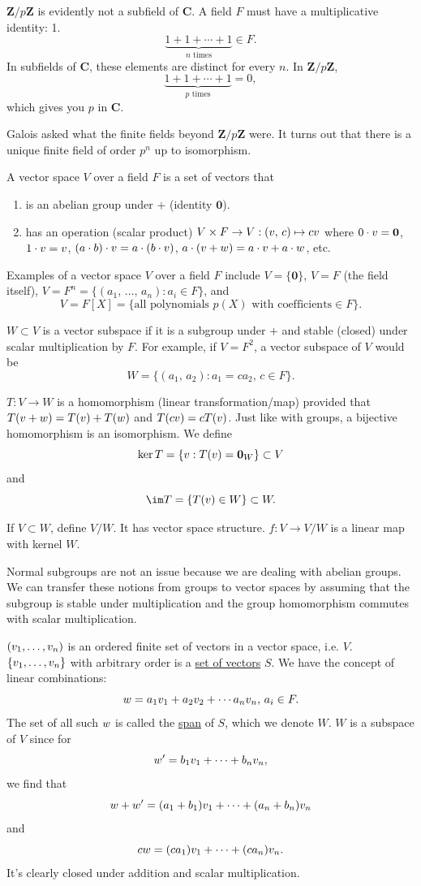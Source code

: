 \documentclass[11pt, oneside]{amsart}
\numberwithin{equation}{section}
\numberwithin{theorem}{section}
\theoremstyle{definition}
\let\bf\relax
\def\Z{\mathbf{Z}}
\def\C{\mathbf{C}}
\def\0{\mathbf{0}}
\begin{document}
$\Z/p\Z$ is evidently not a subfield of $\C$. A field $F$ must have a multiplicative identity: 1. $$\underbrace{1+1+\cdots+1}_{n \textrm{ times}}\in F.$$ In subfields of $\C$, these elements are distinct for every $n$. In $\Z/p\Z$, $$\underbrace{1+1+\cdots+1}_{p \textrm{ times}}=0,$$ which gives you $p$ in $\C$. 

Galois asked what the finite fields beyond $\Z/p\Z$ were. It turns out that there is a unique finite field of order $p^n$ up to isomorphism.

A vector space $V$ over a field $F$ is a set of vectors that
\begin{enumerate}[label=(\roman*)]
\item  is an abelian group under $+$ (identity $\0$).
\item has an operation (scalar product) $V\times F\to V : (\bf{v},\, c)\mapsto c\bf{v}$ where $0\cdot \bf{v} = \0$, $1\cdot \bf{v}=\bf{v}$, $(a\cdot b)\cdot \bf{v} = a\cdot(b\cdot\bf{v})$, $a\cdot(\bf{v}+\bf{w})=a\cdot\bf{v}+a\cdot\bf{w}$, etc.
\end{enumerate}

Examples of a vector space $V$ over a field $F$ include $V=\{\0\}$, $V=F$ (the field itself), $V=F^n=\{(a_1,\,\hdots,\,a_n) :a_i \in F\}$, and $$V=F[X]=\{\textrm{all polynomials $p(X)$ with coefficients} \in F\}.$$

$W\subset V$ is a vector subspace if it is a subgroup under $+$ and stable (closed) under scalar multiplication by $F$. For example, if $V=F^2$, a vector subspace of $V$ would be
$$
W=\{(a_1,\,a_2):a_1=ca_2,\,c\in F\}.
$$

$T:V\to W$ is a homomorphism (linear transformation/map) provided that $T(\bf{v}+\bf{w}) = T(\bf{v})+T( \bf{w})$ and $T(c\bf{v}) = cT(\bf{v})$. Just like with groups, a bijective homomorphism is an isomorphism. We define 
$$
\ker T = \{\bf{v}:T(\bf{v})=\0_W\} \subset V
$$
and
$$
\im T = \{T(\bf{v})\in W\}\subset W.
$$

If $V\subset W$, define $V/W$. It has vector space structure. $f:V\to V/W$ is a linear map with kernel $W$.

Normal subgroups are not an issue because we are dealing with abelian groups. We can transfer these notions from groups to vector spaces by assuming that the subgroup is stable under multiplication and the group homomorphism commutes with scalar multiplication.

$(\bf{v}_1,\hdots,\bf{v}_n)$ is an ordered finite set of vectors in a vector space, i.e. $V$. $\{\bf{v}_1,\hdots,\bf{v}_n\}$ with arbitrary order is a \underline{set of vectors} $S$. We have the concept of linear combinations:
$$
\bf{w}=a_1\bf{v}_1 + a_2\bf{v}_2+\cdots a_n\bf{v}_n,\, a_i\in F.
$$
The set of all such $\bf{w}$ is called the \underline{span} of $S$, which we denote $W$. $W$ is a subspace of $V$ since for $$\bf{w}'=b_1\bf{v}_1+\cdots+b_n\bf{v}_n,$$ we find that $$\bf{w}+\bf{w}'= (a_1+b_1)\bf{v}_1+\cdots+(a_n+b_n)\bf{v}_n $$ and $$c\bf{w} = (ca_1)\bf{v}_1+\cdots+(ca_n)\bf{v}_n.$$ It's clearly closed under addition and scalar multiplication. 
\end{document}

